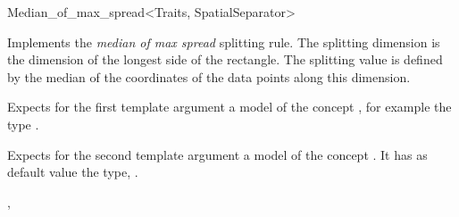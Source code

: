 

\begin{ccRefFunctionObjectClass}{Median_of_max_spread<Traits, SpatialSeparator>}

\ccDefinition
Implements the {\em median of max spread} splitting rule.
The splitting dimension is the dimension of the longest side of the rectangle.
The splitting value is defined by the median of the coordinates of the data points
along this dimension.


\ccParameters

Expects for the first template argument a model of
the concept , for example
the type . 

Expects for the second template argument a model of the concept . It has as default value
the type, .



\ccIsModel



\ccCreation
{}  %


\ccSeeAlso

,\\


\end{ccRefFunctionObjectClass}


